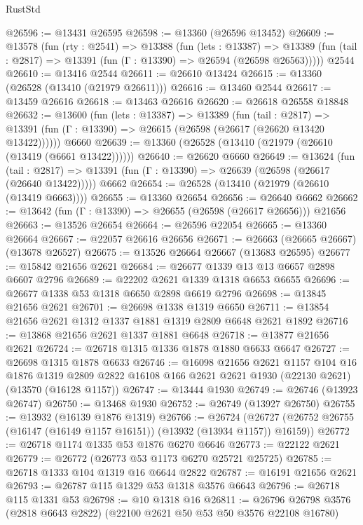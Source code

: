 \begin{lexlean}{RustStd}
\begin{coremodule}
@26596 := @13431 @26595
@26598 := @13360 (@26596 @13452)
@26609 := @13578
    (fun (rty : @2541) =>
    @13388
      (fun (lets : @13387) =>
      @13389 (fun (tail : @2817) => @13391 (fun (Γ : @13390) => @26594 (@26598 @26563)))))
    @2544
@26610 := @13416 @2544
@26611 := @26610 @13424
@26615 := @13360 (@26528 (@13410 (@21979 @26611)))
@26616 := @13460 @2544
@26617 := @13459 @26616
@26618 := @13463 @26616
@26620 := @26618 @26558 @18848
@26632 := @13600
    (fun (lets : @13387) =>
    @13389
      (fun (tail : @2817) =>
      @13391 (fun (Γ : @13390) => @26615 (@26598 (@26617 (@26620 @13420 @13422))))))
    @6660
@26639 := @13360 (@26528 (@13410 (@21979 (@26610 (@13419 (@6661 @13422))))))
@26640 := @26620 @6660
@26649 := @13624
    (fun (tail : @2817) => @13391 (fun (Γ : @13390) => @26639 (@26598 (@26617 (@26640 @13422)))))
    @6662
@26654 := @26528 (@13410 (@21979 (@26610 (@13419 @6663))))
@26655 := @13360 @26654
@26656 := @26640 @6662
@26662 := @13642 (fun (Γ : @13390) => @26655 (@26598 (@26617 @26656))) @21656
@26663 := @13526 @26654
@26664 := @26596 @22054
@26665 := @13360 @26664
@26667 := @22057 @26616 @26656
@26671 := @26663 (@26665 @26667) (@13678 @26527)
@26675 := @13526 @26664 @26667 (@13683 @26595)
@26677 := @15842 @21656 @2621
@26684 := @26677 @1339 @13 @13 @6657 @2898 @6607 @2796
@26689 := @22202 @2621 @1339 @1318 @6653 @6655
@26696 := @26677 @1338 @53 @1318 @6650 @2898 @6619 @2796
@26698 := @13845 @21656 @2621
@26701 := @26698 @1338 @1319 @6650
@26711 := @13854 @21656 @2621 @1312 @1337 @1881 @1319 @2809 @6648 @2621 @1892
@26716 := @13868 @21656 @2621 @1337 @1881 @6648
@26718 := @13877 @21656 @2621
@26724 := @26718 @1315 @1336 @1878 @1880 @6633 @6647
@26727 := @26698 @1315 @1878 @6633
@26746 := @16098
    @21656
    @2621
    @1157
    @104
    @16
    @1876
    @1319
    @2809
    @2822
    @16108
    @166
    @2621
    @2621
    @1930
    (@22130 @2621)
    (@13570 (@16128 @1157))
@26747 := @13444 @1930
@26749 := @26746 (@13923 @26747)
@26750 := @13468 @1930
@26752 := @26749 (@13927 @26750)
@26755 := @13932 (@16139 @1876 @1319)
@26766 := @26724
    (@26727 (@26752 @26755 (@16147 (@16149 @1157 @16151)) (@13932 (@13934 @1157)) @16159))
@26772 := @26718 @1174 @1335 @53 @1876 @6270 @6646
@26773 := @22122 @2621
@26779 := @26772 (@26773 @53 @1173 @6270 @25721 @25725)
@26785 := @26718 @1333 @104 @1319 @16 @6644 @2822
@26787 := @16191 @21656 @2621
@26793 := @26787 @115 @1329 @53 @1318 @3576 @6643
@26796 := @26718 @115 @1331 @53
@26798 := @10 @1318 @16
@26811 := @26796 @26798 @3576 (@2818 @6643 @2822) (@22100 @2621 @50 @53 @50 @3576 @22108 @16780)

\end{coremodule}
\end{lexlean}
